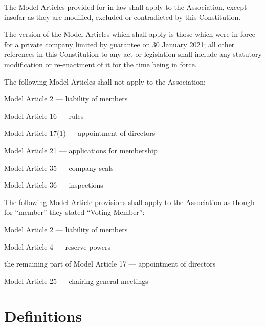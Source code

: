 \documentclass[10pt]{mk-articles-of-association}
\begin{document}
\begin{constenum}

\item The Model Articles provided for in law shall apply to the
  Association, except insofar as they are modified, excluded or
  contradicted by this Constitution.

\item The version of the Model Articles which shall apply is those
  which were in force for a private company limited by guarantee on
  30 January 2021; all other references in this Constitution
  to any act or legislation shall include any statutory modification
  or re-enactment of it for the time being in force.

\item The following Model Articles shall not apply to the Association:
  \begin{constenum}
  \item Model Article 2 --- liability of members
  \item Model Article 16 --- rules
  \item Model Article 17(1) --- appointment of directors
  \item Model Article 21 --- applications for membership
  \item Model Article 35 --- company seals
  \item Model Article 36 --- inspections
  \end{constenum}

\item The following Model Article provisions shall apply to the Association
  as though for ``member'' they stated ``Voting Member'':

  \begin{constenum}
  \item Model Article 2 --- liability of members
  \item Model Article 4 --- reserve powers
  \item the remaining part of Model Article 17 --- appointment of directors
  \item Model Article 25 --- chairing general meetings
  \end{constenum}

\end{constenum}

\section{Definitions}
\end{document}

